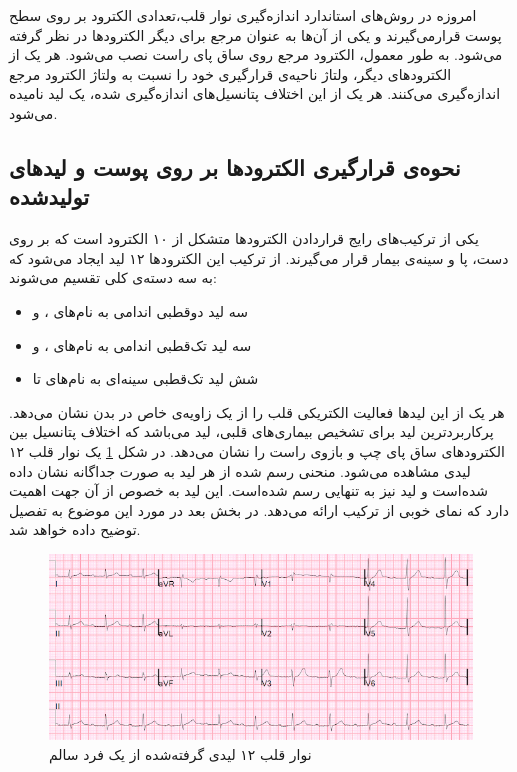 امروزه در روش‌های استاندارد اندازه‌گیری نوار قلب،تعدادی الکترود بر روی سطح پوست قرارمی‌گیرند و یکی از آن‌ها به عنوان مرجع برای دیگر الکترودها در نظر گرفته می‌شود. به طور معمول، الکترود مرجع روی ساق پای راست نصب می‌شود. \cite{ECGSurvey} هر یک از الکترودهای دیگر، ولتاژ ناحیه‌ی قرارگیری خود را نسبت به ولتاژ الکترود مرجع اندازه‌گیری می‌کنند. هر یک از این اختلاف پتانسیل‌های اندازه‌گیری شده، یک لید نامیده می‌شود. 
\subsection{نحوه‌ی قرارگیری الکترودها بر روی پوست و لیدهای تولیدشده}

یکی از ترکیب‌های رایج قراردادن الکترودها متشکل از ۱۰ الکترود است که بر روی دست، پا و سینه‌ی بیمار قرار می‌گیرند. از ترکیب این الکترودها ۱۲ لید ایجاد می‌شود که به سه دسته‌ی کلی تقسیم می‌شوند:
\begin{itemize}
	\item  سه لید دوقطبی اندامی به نام‌های ،  و 
	\item سه لید تک‌قطبی اندامی به نام‌های ،  و 
	\item شش لید تک‌قطبی سینه‌ای به نام‌های  تا 
\end{itemize}
  هر یک از این لیدها فعالیت الکتریکی قلب را از یک زاویه‌ی خاص در بدن نشان می‌دهد. پرکاربردترین لید برای تشخیص بیماری‌های قلبی، لید  می‌باشد که اختلاف پتانسیل بین الکترودهای ساق پای چپ و بازوی راست را نشان می‌دهد. در شکل \ref{fig:leads} یک نوار قلب ۱۲ لیدی مشاهده می‌شود. منحنی رسم شده از هر لید به صورت جداگانه نشان داده شده‌است و لید  نیز به تنهایی رسم شده‌است. این لید به خصوص از آن جهت اهمیت دارد که نمای خوبی از ترکیب 
ارائه می‌دهد. در بخش بعد در مورد این موضوع به تفصیل توضیح داده خواهد شد.
\begin{figure}
\centering
\includegraphics[width=16cm]{Figures/leads.png}
\caption{نوار قلب ۱۲ لیدی گرفته‌شده از یک فرد سالم\cite{Drsmith}}
\label{fig:leads}
\end{figure}

